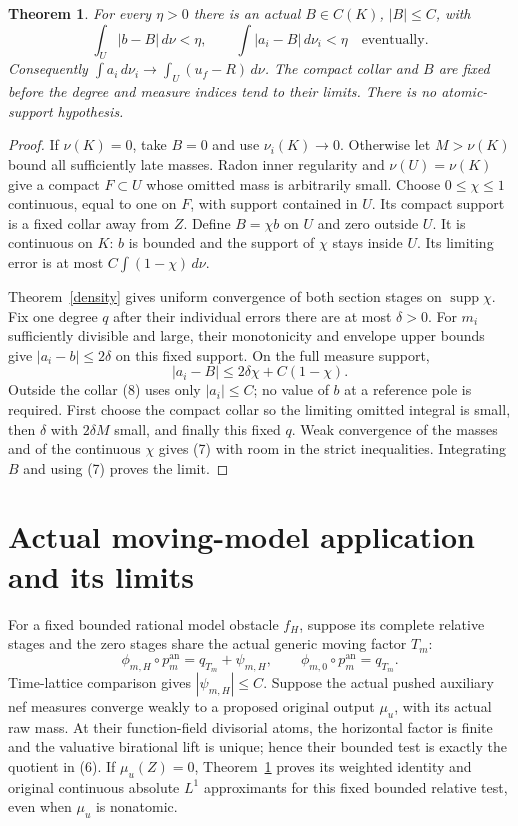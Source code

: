 \documentclass[11pt]{article}
\newtheorem{theorem}{Theorem}
\begin{document}
\begin{theorem}\label{weighted}
For every $\eta>0$ there is an actual $B\in C(K)$, $|B|\leq C$, with
\[
 \int_U|b-B|\,d\nu<\eta,\qquad
 \int|a_i-B|\,d\nu_i<\eta\quad\text{eventually}.          \tag{7}
\]
Consequently $\int a_i\,d\nu_i\to\int_U(u_f-R)\,d\nu$.
The compact collar and $B$ are fixed before the degree and measure
indices tend to their limits. There is no atomic-support hypothesis.
\end{theorem}
\begin{proof}
If $\nu(K)=0$, take $B=0$ and use $\nu_i(K)\to0$.
Otherwise let $M>\nu(K)$ bound all sufficiently late masses.
Radon inner regularity and $\nu(U)=\nu(K)$ give a compact
$F\subset U$ whose omitted mass is arbitrarily small. Choose
$0\leq\chi\leq1$ continuous, equal to one on $F$, with support
contained in $U$. Its compact support is a fixed collar away from $Z$.
Define $B=\chi b$ on $U$ and zero outside $U$. It is continuous
on $K$: $b$ is bounded and the support of $\chi$ stays inside $U$.
Its limiting error is at most $C\int(1-\chi)\,d\nu$.

Theorem~\ref{density} gives uniform convergence of both section stages
on $\operatorname{supp}\chi$. Fix one degree $q$ after their
individual errors there are at most $\delta>0$. For $m_i$ sufficiently
divisible and large, their monotonicity and envelope upper bounds give
$|a_i-b|\leq2\delta$ on this fixed support. On the full measure support,
\[
                   |a_i-B|\leq2\delta\chi+C(1-\chi).
                                                        \tag{8}
\]
Outside the collar (8) uses only $|a_i|\leq C$; no value of $b$
at a reference pole is required. First choose the compact collar
so the limiting omitted integral is small, then $\delta$ with
$2\delta M$ small, and finally this fixed $q$. Weak convergence of
the masses and of the continuous $\chi$ gives (7) with room in the
strict inequalities. Integrating $B$ and using (7) proves the limit.
\end{proof}

\section{Actual moving-model application and its limits}
For a fixed bounded rational model obstacle $f_H$, suppose its
complete relative stages and the zero stages share the actual generic
moving factor $T_m$:
\[
 \phi_{m,H}\circ p_m^{\mathrm{an}}=q_{T_m}+\psi_{m,H},
 \qquad\phi_{m,0}\circ p_m^{\mathrm{an}}=q_{T_m}.
                                                        \tag{9}
\]
Time-lattice comparison gives $|\psi_{m,H}|\leq C$.
Suppose the actual pushed auxiliary nef measures converge weakly
to a proposed original output $\mu_u$, with its actual raw mass.
At their function-field divisorial atoms, the horizontal factor is
finite and the valuative birational lift is unique; hence their
bounded test is exactly the quotient in (6). If $\mu_u(Z)=0$,
Theorem~\ref{weighted} proves its weighted identity and original
continuous absolute $L^1$ approximants for this fixed bounded relative
test, even when $\mu_u$ is nonatomic.
\end{document}
